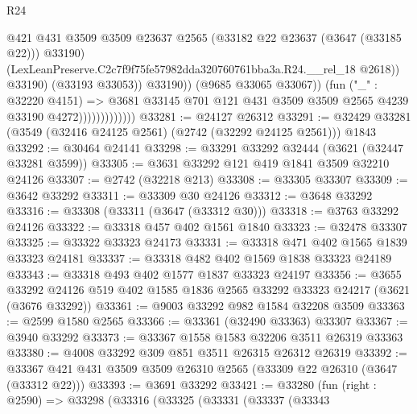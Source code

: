\begin{lexlean}{R24}
\begin{coremodule}
                                          @421
                                          @431
                                          @3509
                                          @3509
                                          @23637
                                          @2565
                                          (@33182 @22 @23637 (@3647 (@33185 @22)))
                                          @33190)
                                        (LexLeanPreserve.C2c7f9f75fe57982dda320760761bba3a.R24.__rel_18
                                          @2618))
                                      @33190)
                                    (@33193 @33053))
                                  @33190))
                              (@9685 @33065 @33067))
                            (fun ("_" : @32220 @4151) =>
                            @3681
                              @33145
                              @701
                              @121
                              @431
                              @3509
                              @3509
                              @2565
                              @4239
                              @33190
                              @4272)))))))))))))
@33281 := @24127 @26312
@33291 := @32429 @33281 (@3549 (@32416 @24125 @2561) (@2742 (@32292 @24125 @2561))) @1843
@33292 := @30464 @24141
@33298 := @33291 @33292 @32444 (@3621 (@32447 @33281 @3599))
@33305 := @3631 @33292 @121 @419 @1841 @3509 @32210 @24126
@33307 := @2742 (@32218 @213)
@33308 := @33305 @33307
@33309 := @3642 @33292
@33311 := @33309 @30 @24126
@33312 := @3648 @33292
@33316 := @33308 (@33311 (@3647 (@33312 @30)))
@33318 := @3763 @33292 @24126
@33322 := @33318 @457 @402 @1561 @1840
@33323 := @32478 @33307
@33325 := @33322 @33323 @24173
@33331 := @33318 @471 @402 @1565 @1839 @33323 @24181
@33337 := @33318 @482 @402 @1569 @1838 @33323 @24189
@33343 := @33318 @493 @402 @1577 @1837 @33323 @24197
@33356 := @3655
    @33292
    @24126
    @519
    @402
    @1585
    @1836
    @2565
    @33292
    @33323
    @24217
    (@3621 (@3676 @33292))
@33361 := @9003 @33292 @982 @1584 @32208 @3509
@33363 := @2599 @1580 @2565
@33366 := @33361 (@32490 @33363) @33307
@33367 := @3940 @33292
@33373 := @33367 @1558 @1583 @32206 @3511 @26319 @33363
@33380 := @4008 @33292 @309 @851 @3511 @26315 @26312 @26319
@33392 := @33367 @421 @431 @3509 @3509 @26310 @2565 (@33309 @22 @26310 (@3647 (@33312 @22)))
@33393 := @3691 @33292
@33421 := @33280
    (fun (right : @2590) =>
    @33298
      (@33316
        (@33325
          (@33331
            (@33337
              (@33343

\end{coremodule}
\end{lexlean}
